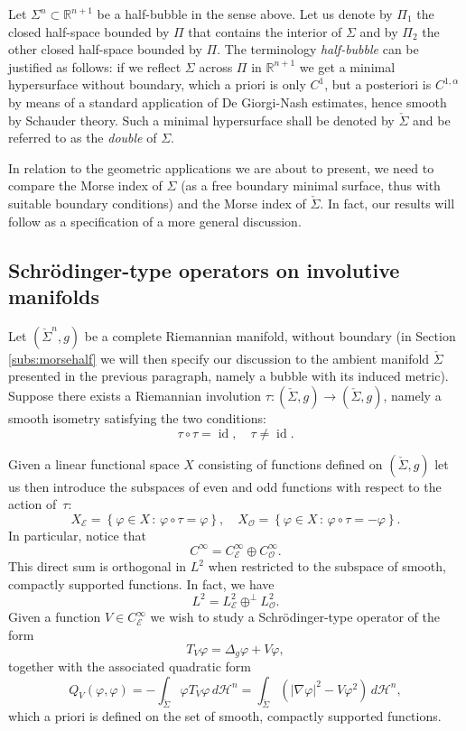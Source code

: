 \documentclass[JEP,XML,SOM,Unicode]{cedram}
\let\mathcal\mathscr
\newcommand{\sep}{\,:\,}
\DeclareMathOperator{\id}{id}
\theoremstyle{definition}
\newcommand{\R}{\mathbb{R}}
\newcommand{\h}{\mathscr{H}}
\begin{document}
Let $\Sigma^n\subset \R^{n+1}$ be a half-bubble in the sense above. Let us denote by $\Pi_1$ the closed half-space bounded by $\Pi$ that contains the interior of $\Sigma$ and by $\Pi_2$ the other closed half-space bounded by $\Pi$. The terminology \emph{half-bubble} can be justified as follows: if we reflect $\Sigma$ across $\Pi$ in $\R^{n+1}$ we get a minimal hypersurface without boundary, which a priori is only $C^1$, but a posteriori is $C^{1,\alpha}$ by means of a standard application of De Giorgi-Nash estimates, hence smooth by Schauder theory. Such a minimal hypersurface shall be denoted by $\check{\Sigma}$ and be referred to as the \emph{double} of $\Sigma$.

In relation to the geometric applications we are about to present, we need to compare the Morse index of $\Sigma$ (as a free boundary minimal surface, thus with suitable boundary conditions) and the Morse index of $\check{\Sigma}$. In fact, our results will follow as a specification of a more general discussion.

\subsection{Schrödinger-type operators on involutive manifolds}\label{subs:general}

Let $(\check{\Sigma}^{n},g)$ be a complete Riemannian manifold, without boundary (in Section \ref{subs:morsehalf} we will then specify our discussion to the ambient manifold $\check{\Sigma}$ presented in the previous paragraph, namely a bubble with its induced metric). Suppose there exists a Riemannian involution $\tau:(\check{\Sigma},g) \to (\check{\Sigma},g)$, namely a smooth isometry satisfying the two conditions:
\[
\tau\circ\tau = \id, \quad \tau\neq \id.
\]

Given a linear functional space $X$ consisting of functions defined on $(\check{\Sigma},g)$ let us then introduce the subspaces of even and odd functions with respect to the action of~$\tau$:
\[
X_\mathcal{E}=\left\{\varphi\in X\sep \varphi\circ\tau=\varphi \right\}, \quad X_\mathcal{O}=\left\{\varphi\in X\sep \varphi\circ\tau=-\varphi \right\}.
\]
In particular, notice that
\[
C^{\infty}=C^{\infty}_{\mathcal{E}}\oplus C^{\infty}_{\mathcal{O}}.
\]
This direct sum is orthogonal in $L^2$ when restricted to the subspace of smooth, compactly supported functions. In fact, we have
\[
L^2=L^2_{\mathcal{E}}\oplus^{\perp} L^2_{\mathcal{O}}.
\]
Given a function $V\in C^{\infty}_{\mathcal{E}}$ we wish to study a Schrödinger-type operator of the form
\[
T_V\varphi=\Delta_g\varphi+V\varphi,
\]
together with the associated quadratic form
\[
Q_V(\varphi,\varphi)=-\int_{\check{\Sigma}}\varphi T_V \varphi\,d\h^n=\int_{\check{\Sigma}}(|\nabla \varphi|^2-V\varphi^2)\,d\h^n,
\]
which a priori is defined on the set of smooth, compactly supported functions.
\end{document}
